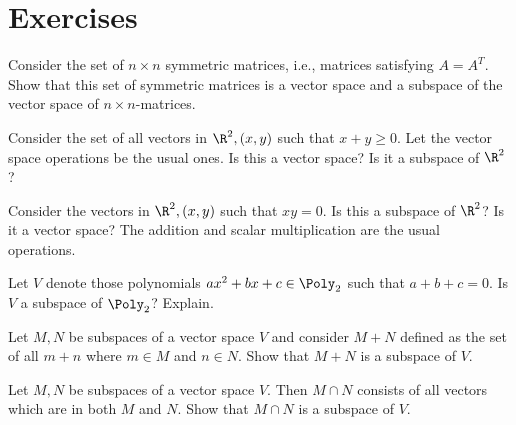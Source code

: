 \section*{Exercises}

\begin{ex}
  Consider the set of $n\times n$ symmetric matrices, i.e., matrices
  satisfying $A=A^{T}$. Show that this set of symmetric matrices is a
  vector space and a subspace of the vector space of
  $n\times n$-matrices.
\end{ex}

\begin{ex}
  Consider the set of all vectors in $\R^{2},(x,y) $
  such that $x+y\geq 0$. Let the vector space operations be the usual ones. Is
  this a vector space? Is it a subspace of $\R^{2}$?
\end{ex}

\begin{ex}
  Consider the vectors in $\R^{2},(x,y) $ such that $xy=0$. Is this a subspace of $\R^{2}$? Is it a vector space? The
  addition and scalar multiplication are the usual operations.
\end{ex}

\begin{ex}
  Let $V$ denote those polynomials $ax^2+bx+c\in\Poly_{2}$ such that
  $a+b+c=0$. Is $V$ a subspace of $\Poly_{2}$?  Explain.
\end{ex}

\begin{ex}
  Let $M,N$ be subspaces of a vector space $V$ and consider $M+N$
  defined as the set of all $m+n$ where $m\in M$ and $n\in N$. Show that $M+N$
  is a subspace of $V$.
\end{ex}

\begin{ex}
  Let $M,N$ be subspaces of a vector space $V$. Then $M\cap N$ consists
  of all vectors which are in both $M$ and $N$. Show that $M\cap N$ is a
  subspace of $V$.
\end{ex}

